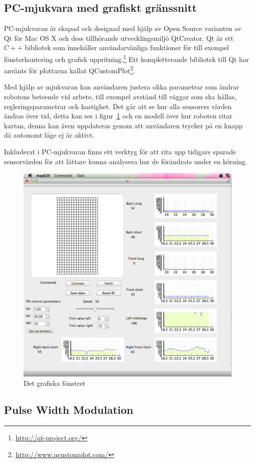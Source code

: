 \documentclass[a4paper,12pt,fleqn]{article}
\begin{document}
\subsection{PC-mjukvara med grafiskt gränssnitt}

PC-mjukvaran är skapad och designad med hjälp av Open Source varianten av Qt för Mac OS X och dess tillhörande utvecklingsmiljö QtCreator. Qt är ett $C++$ bibliotek som innehåller användarvänliga funktioner för till exempel fönsterhantering och grafisk uppritning.\footnote{\url{http://qt-project.org/}} Ett kompletterande bibliotek till Qt har använts för plottarna kallat QCustomPlot\footnote{\url{http://www.qcustomplot.com/}}.

Med hjälp av mjukvaran kan användaren justera olika parametrar som ändrar robotens beteende vid arbete, till exempel avstånd till väggar som ska hållas, regleringsparametrar och hastighet. Det går att se hur alla sensorers värden ändras över tid, detta kan ses i figur~\ref{fig:gui} och en modell över hur roboten ritar kartan, denna kan även uppdateras genom att användaren trycker på en knapp då autonomt läge ej är aktivt.

Inkluderat i PC-mjukvaran finns ett verktyg för att rita upp tidigare sparade sensorvärden för att lättare kunna analysera hur de förändrats under en körning.

\begin{figure}[htp] %
  \begin{center}
  \includegraphics[keepaspectratio=true,width=0.5\linewidth]{gui.png}  %
  \end{center}
  \caption{Det grafiska fönstret} %
  \label{fig:gui}
\end{figure}

\subsection{Pulse Width Modulation}
\end{document}
